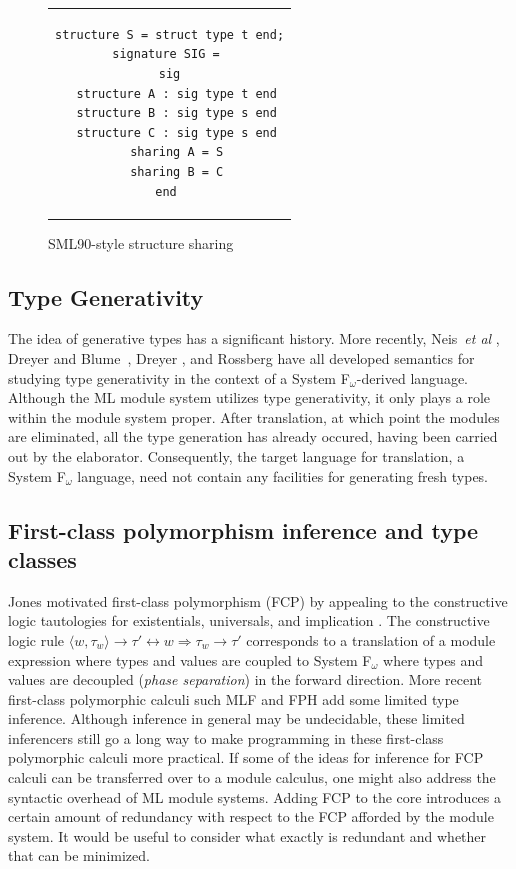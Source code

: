 \begin{figure}
\begin{center}
\begin{tabular}{c}
\begin{lstlisting}
structure S = struct type t end;
signature SIG = 
sig
  structure A : sig type t end
  structure B : sig type s end
  structure C : sig type s end
  sharing A = S
  sharing B = C
end	
\end{lstlisting}
\end{tabular}
\end{center}	
\caption{SML90-style structure sharing}
\label{fig:nonlocalsharing}
\end{figure}

\subsection{Type Generativity}

The idea of generative types has a significant history. More recently,
Neis~\emph{et al} \cite{neis:icfp09}, Dreyer and
Blume~\cite{dreyerblume:esop07}, Dreyer \cite{dreyer05}, and Rossberg
\cite{rossberg:ppdp03} have all developed semantics for studying type
generativity in the context of a System F$_\omega$-derived
language. Although the ML module system utilizes type generativity, it
only plays a role within the module system proper. After translation,
at which point the modules are eliminated, all the type generation has
already occured, having been carried out by the
elaborator. Consequently, the target language for translation, a
System F$_\omega$ language, need not contain any facilities for
generating fresh types. 

\subsection{First-class polymorphism inference and type classes}
	Jones \cite{jonesfcp} motivated first-class polymorphism (FCP) by appealing to the constructive logic tautologies for existentials, universals, and implication  \cite{jonesfcp}. The constructive logic rule $\langle w, \tau_w\rangle \rightarrow \tau' \leftrightarrow w \Rightarrow \tau_w \rightarrow \tau'$ corresponds to a translation of a module expression where types and values are coupled to System F$_\omega$ where types and values are decoupled (\emph{phase separation}) in the forward direction. More recent first-class polymorphic calculi such MLF \cite{Lebotlan-Remy/mlf-icfp} and FPH \cite{fph} add some limited type inference. Although inference in general may be undecidable, these limited inferencers still go a long way to make programming in these first-class polymorphic calculi more practical. If some of the ideas for inference for FCP calculi can be transferred over to a module calculus, one might also address the syntactic overhead of ML module systems. Adding FCP to the core introduces a certain amount of redundancy with respect to the FCP afforded by the module system. It would be useful to consider what exactly is redundant and whether that can be minimized. 
		
